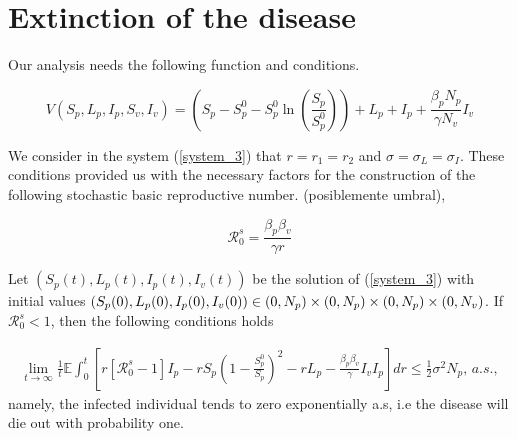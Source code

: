 \section{Extinction of the disease}

Our analysis needs the following function and conditions.

\begin{equation}\label{eq4}
V(S_p,L_p,I_p,S_v,I_v) = \left(S_p-S_p^0-S_p^0\ln\left(\frac{S_p}{S_p^0}\right)\right)+L_p+I_p+\frac{\beta_p N_p}{\gamma N_v}I_v
\end{equation}

We consider in the system (\ref{system_3}) that $r=r_1=r_2$ and $\sigma=\sigma_L=\sigma_I$. These conditions provided us with the necessary factors for the construction of the following stochastic basic reproductive number. (posiblemente umbral), 

\begin{equation}\label{eq5}
	\mathcal{R}_0^s=\frac{\beta_p\beta_v}{\gamma r}
\end{equation}

\begin{theorem}\label{theorem_2}
	Let $(S_p(t),L_p(t),I_p(t),I_v(t))$ be the solution of (\ref{system_3}) with initial values $(S_p(0),L_p(0),I_p(0),I_v(0))\in (0,N_p)\times(0,N_p)\times(0,N_p)\\\times(0,N_v)$. If $\mathcal{R}^s_0<1$, then the following conditions holds

	\begin{align*}
		\lim\limits_{t\rightarrow \infty}\frac{1}{t}\mathbb{E}\int_{0}^{t}\left[{r[\mathcal{R}^s_0-1]I_p-rS_p\left(1-\frac{S^0_p}{S_p}\right)^2-rL_p-\frac{\beta_p\beta_v}{\gamma}I_vI_p}\right]dr\leq \frac{1}{2}\sigma^2N_p,\, a.s.,
	\end{align*}
	namely, the infected individual tends to zero exponentially a.s, i.e the disease will die out with probability one.
\end{theorem}

